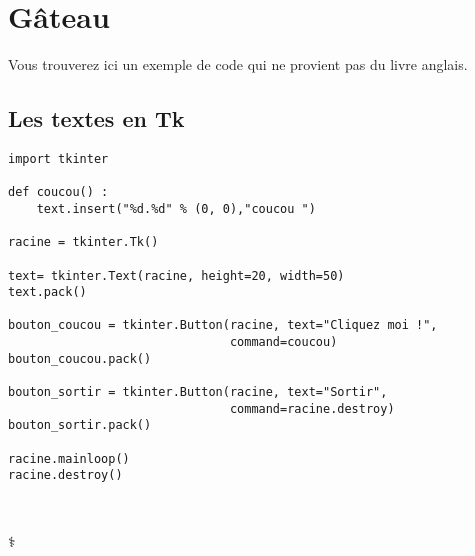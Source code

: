 
\chapter{Gâteau}
Vous trouverez ici un exemple de code qui ne provient pas du livre anglais.
\section{Les textes en Tk}

\begin{Verbatim}[frame=single,rulecolor=\color{mbleu}, label=à taper]
import tkinter

def coucou() :
    text.insert("%d.%d" % (0, 0),"coucou ")

racine = tkinter.Tk()

text= tkinter.Text(racine, height=20, width=50)
text.pack()

bouton_coucou = tkinter.Button(racine, text="Cliquez moi !",
                               command=coucou)
bouton_coucou.pack()

bouton_sortir = tkinter.Button(racine, text="Sortir",
                               command=racine.destroy)
bouton_sortir.pack()

racine.mainloop()
racine.destroy()
\end{Verbatim}
\newpage
~

\vfill
\begin{center}
\textrm{⚕}
\end{center}
\vfill

